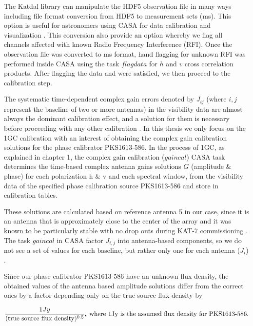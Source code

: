  The Katdal library can manipulate the HDF5 observation file in many ways including file format conversion from HDF5 to measurement sets (ms). This option is useful for astronomers using CASA for data calibration and visualization \citep{foley2016engineering}. This conversion also provide an option whereby we flag all channels affected with known Radio Frequency Interference (RFI). Once the observation file was converted to ms format, hand flagging for unknown RFI was performed inside CASA using the task $\textit{flagdata}$ for $h$ and $v$ cross correlation products. After flagging the data and were satisfied, we then proceed to the calibration step. 
 
The systematic time-dependent complex gain errors denoted by $J_{ij}$ (where $i,j$ represent the baseline of two or more antennas) in the visibility data are almost always the dominant calibration effect, and a solution for them is necessary before proceeding with any other calibration \citep{ott2013casa}. In this thesis we only focus on the 1GC calibration with an interest of obtaining the complex gain calibration solutions for the phase calibrator PKS1613-586. In the process of 1GC, as explained in chapter 1, the complex gain calibration ($\textit{gaincal}$)  CASA task determines the time-based complex antenna gains solutions $G$ (amplitude \& phase) for each polarization h \& v and each spectral window, from the visibility data of the specified phase calibration source PKS1613-586 and store in calibration tables.
 
These solutions are calculated based on reference antenna 5 in our case, since it is an antenna that is approximately close to the center of the array and it was known to be particularly stable with no drop outs during KAT-7 commissioning \citep{ott2013casa}. The task $\textit{gaincal}$ in CASA factor $J_{i,j}$ into antenna-based components, so we do not see a set of values for each baseline, but rather only one for each antenna ($J_i$) \citep{CosmoAIMS}. 

Since our phase calibrator PKS1613-586 have an unknown flux density, the obtained values of the antenna based amplitude solutions differ from the correct ones by a factor depending only on the true source flux density by 

\begin{equation}
\frac{1 Jy}{(\text{true source flux density})^{0.5}},\;  \text{where 1Jy is the assumed flux density for \text{PKS1613-586}}.
\end{equation} 

